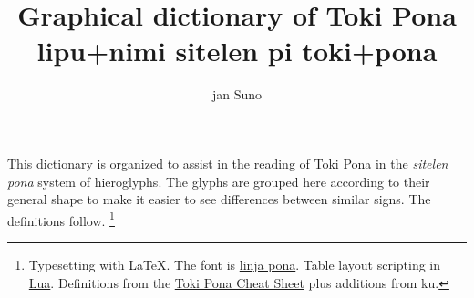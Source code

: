 \documentclass{article}
\title{Graphical dictionary of Toki Pona \\[1ex]{\tpf lipu+nimi sitelen pi toki+pona}}
\author{jan Suno}
\begin{document}
\maketitle
This dictionary is organized to assist in the reading of
Toki Pona in the \textit{sitelen} \textit{pona}
system of hieroglyphs.  The glyphs are grouped here
according to their general shape to make it easier to
see differences between similar signs.  The definitions
follow.
\footnote{Typesetting with LaTeX.  The font is
  \href{http://musilili.net/linja-pona/}{linja pona}.
  Table layout scripting in
  \href{http://lua.org}{Lua}.  Definitions from the
  \href{https://blinry.org/toki-pona-cheat-sheet}{Toki Pona Cheat Sheet}
  plus additions from ku.}


\pagebreak
\newcommand\tpDef[2]{\textbf{#1} {\large\tpf #1} #2}
\end{document}
